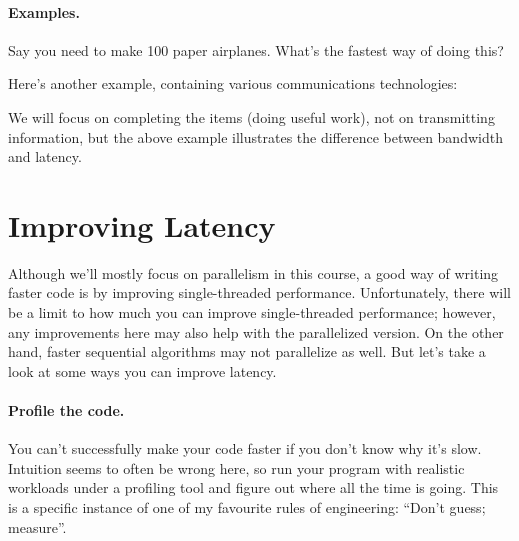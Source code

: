 \paragraph{Examples.} Say you need to make
100 paper airplanes. What's the fastest way of doing this?

\vspace*{7em}

Here's another example, containing various communications technologies:

\begin{center}
\end{center}


We will focus on completing the items (doing useful work), not on transmitting information, but the above example illustrates the difference between bandwidth and latency.

\section*{Improving Latency}
Although we'll mostly focus on parallelism in this course, a
good way of writing faster code is by improving single-threaded 
performance. Unfortunately, there will be a limit to how much you can
improve single-threaded performance; however, any improvements here
may also help with the parallelized version. On the other hand, faster
sequential algorithms may not parallelize as well. But let's take a look at some
ways you can improve latency.

\paragraph{Profile the code.} You can't successfully make your code 
faster if you don't know why it's slow. Intuition seems to often be
wrong here, so run your program with realistic workloads under a profiling
tool and figure out where all the time is going. This is a specific instance of one of my favourite rules of engineering: ``Don't guess; measure''. 

